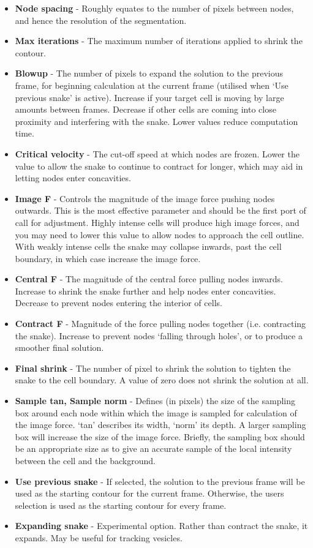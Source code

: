 \documentclass[a4paper,12pt]{article}
\begin{document}
\begin{itemize}
\item \textbf{Node spacing} - Roughly equates to the number of pixels between nodes, and hence the resolution of the segmentation.
\item \textbf{Max iterations} - The maximum number of iterations applied to shrink the contour.
\item \textbf{Blowup} - The number of pixels to expand the solution to the previous frame, for beginning 
calculation at the current frame (utilised when `Use previous snake' is active).  Increase if your target cell is moving by large 
amounts between frames.  Decrease if other cells are coming into close proximity and interfering with the snake.  Lower
values reduce computation time.
\item \textbf{Critical velocity} - The cut-off speed at which nodes are frozen.  Lower the value to allow the snake to continue 
to contract for longer, which may aid in letting nodes enter concavities.
\item \textbf{Image F} - Controls the magnitude of the image force pushing nodes outwards.  This is the most effective parameter 
and should be the first port of call for adjustment.  Highly intense cells will produce high image forces, and you may need to lower 
this value to allow nodes to approach the cell outline.  With weakly intense cells the snake may collapse inwards, past the cell 
boundary, in which case increase the image force.
\item \textbf{Central F} - The magnitude of the central force pulling nodes inwards.  Increase to shrink the snake further and help nodes enter concavities.
Decrease to prevent nodes entering the interior of cells. 
\item \textbf{Contract F} - Magnitude of the force pulling nodes together (i.e. contracting the snake).  Increase to prevent nodes `falling
through holes', or to produce a smoother final solution.
\item \textbf{Final shrink} - The number of pixel to shrink the solution to tighten the snake to the cell boundary.  A value of zero does
not shrink the solution at all.
\item \textbf{Sample tan, Sample norm} - Defines (in pixels) the size of the sampling box around each node within which the 
image is sampled for calculation of the image force.  `tan' describes its width, `norm' its depth.  A larger sampling box will increase 
the size of the image force.  Briefly, the sampling box should be an appropriate size as to give an accurate sample of the local
 intensity between the cell and the background.
\item \textbf{Use previous snake} - If selected, the solution to the previous frame will be used as the starting contour for the current frame.
Otherwise, the users selection is used as the starting contour for every frame.
\item \textbf{Expanding snake} - Experimental option. Rather than contract the snake, it expands.  May be useful for tracking vesicles.
\end{itemize}
\end{document}

